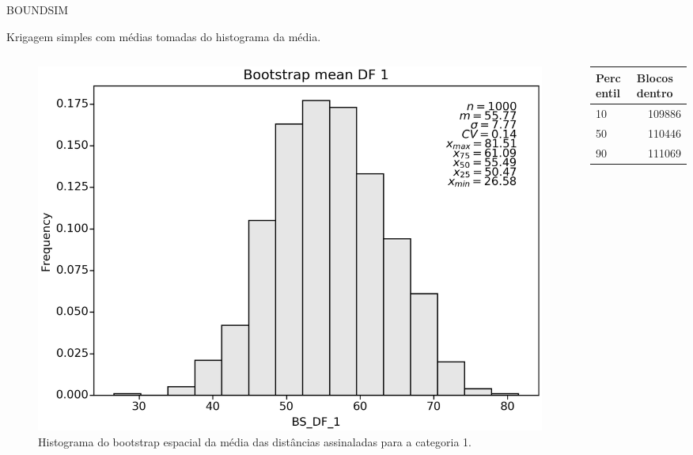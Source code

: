 \documentclass[aspectratio=169]{beamer}
\begin{document}
\begin{frame}{BOUNDSIM}

Krigagem simples com médias tomadas do histograma da média.

\begin{columns}
	\begin{column}{0.5\textwidth}
	\begin{figure}[H]
		\caption{\label{bs_df_1}Histograma do bootstrap espacial da média das distâncias assinaladas para a categoria 1.}
		\begin{center}
			\includegraphics[width=\textwidth]{capitulo_2/BS_DF_1.png}
		\end{center}
	\end{figure}
	\end{column}
	\begin{column}{0.5\textwidth}  %
	\begin{table}[H]
			\begin{center}
					\begin{tabular}{lr}
					Percentil & \multicolumn{1}{l}{Blocos dentro} \\ \hline
					10 & 109886 \\
					50 & 110446 \\
					90 & 111069 \\ \hline
				\end{tabular}

			\end{center}
	\end{table}
	\end{column}
\end{columns}

\end{frame}
\end{document}
